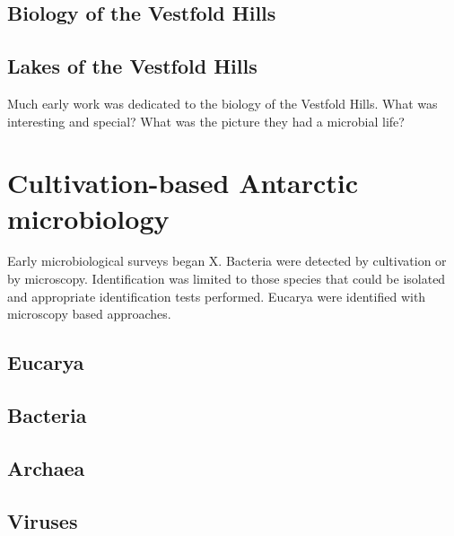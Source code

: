 \subsection{Biology of the Vestfold Hills}

\subsection{Lakes of the Vestfold Hills}

Much early work was dedicated to the biology of the Vestfold Hills.
What was interesting and special?
What was the picture they had a microbial life?


\section{Cultivation-based Antarctic microbiology}

Early microbiological surveys began X.
Bacteria were detected by cultivation or by microscopy. 
Identification was limited to those species that could be isolated and appropriate identification tests performed.
Eucarya were identified with microscopy based approaches.


\subsection{Eucarya}
\subsection{Bacteria}
\subsection{Archaea}
\subsection{Viruses}


